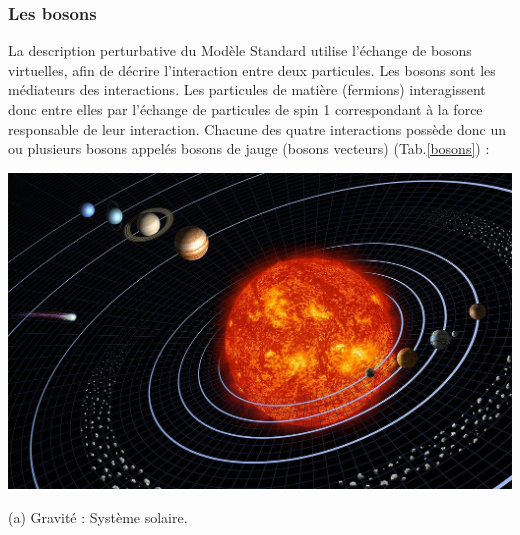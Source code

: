 \begin{table}[H]
\begin{tabular}{|O|O|O|O|N}
\hline
\end{tabular} 
\label{fermions}
\end{table}	

\subsubsection{Les bosons}
La description perturbative du Modèle Standard utilise l'échange de bosons virtuelles, afin de décrire l'interaction entre deux particules. Les bosons sont les médiateurs des interactions. Les particules de matière (fermions) interagissent donc entre elles par l'échange de particules de spin 1 correspondant à la force responsable de leur interaction.
\smallskip
Chacune des quatre interactions possède donc un ou plusieurs bosons appelés bosons de jauge (bosons vecteurs) (Tab.\ref{bosons}) :
\marginpar
{
\begin{center}
\includegraphics[width=\marginparwidth]{SM/solaire.jpg}
\begin{center}\normalfont\small {(a) Gravité : Système solaire.}\end{center}
\end{center}
}
\marginpar

